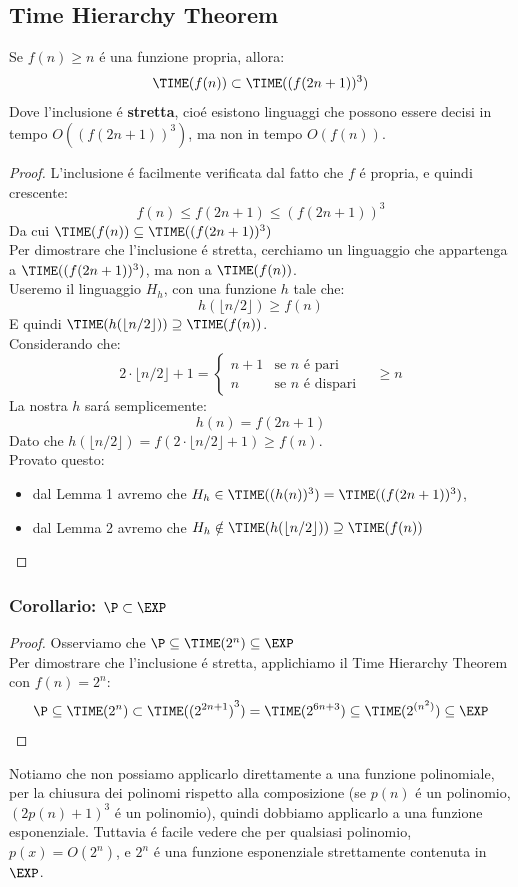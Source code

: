 \subsection{Time Hierarchy Theorem}
Se $f(n) \geq n$ é una funzione propria, allora:
\[\TIME(f(n)) \subset \TIME((f(2n + 1))^3)\]
Dove l'inclusione é \textbf{stretta}, cioé esistono linguaggi che possono essere decisi in tempo $O((f(2n+1))^3)$, ma non in tempo $O(f(n))$.
\begin{proof}
L'inclusione é facilmente verificata dal fatto che $f$ é propria, e quindi crescente: 
\[f(n) \leq f(2n + 1) \leq (f(2n + 1))^3\]
Da cui $\TIME(f(n)) \subseteq \TIME((f(2n+1))^3)$ \\

Per dimostrare che l'inclusione é stretta, cerchiamo un linguaggio che appartenga a $\TIME((f(2n + 1))^3)$, ma non a $\TIME(f(n))$. \\

Useremo il linguaggio $H_h$, con una funzione $h$ tale che:
\[
h(\lfloor n/2 \rfloor) \geq f(n)
\]
E quindi $\TIME(h(\lfloor n/2 \rfloor)) \supseteq \TIME(f(n))$. \\

Considerando che:
\[
2 \cdot \lfloor n/2 \rfloor + 1 =
\begin{cases}
    n + 1 & \text{se $n$ é pari} \\
    n     & \text{se $n$ é dispari}
\end{cases}
\quad \geq n
\]
La nostra $h$ sará semplicemente:
\[h(n) = f(2n + 1)\]
Dato che $h(\lfloor n/2 \rfloor) = f(2 \cdot \lfloor n/2 \rfloor + 1) \geq f(n)$. \\

Provato questo:
\begin{itemize}
    \item dal Lemma 1 avremo che $H_h \in \TIME((h(n))^3) = \TIME((f(2n + 1))^3)$, 
    \item dal Lemma 2 avremo che $H_h \notin \TIME(h(\lfloor n/2 \rfloor)) \supseteq \TIME(f(n))$
\end{itemize}    
\end{proof}

\subsubsection{Corollario: $\P \subset \EXP$}
\begin{proof}
    Osserviamo che $\P \subseteq \TIME(2^n) \subseteq \EXP$ \\
    Per dimostrare che l'inclusione é stretta, applichiamo il Time Hierarchy Theorem con $f(n) = 2^n$:
    \[\P \subseteq \TIME(2^n) \subset \TIME({(2^{2n+1})}^3) = \TIME(2^{6n+3}) \subseteq \TIME(2^{(n^2)}) \subseteq \EXP\]
\end{proof}
Notiamo che non possiamo applicarlo direttamente a una funzione polinomiale, per la chiusura dei polinomi rispetto alla composizione
(se $p(n)$ é un polinomio, $(2p(n) + 1)^3$ é un polinomio), 
quindi dobbiamo applicarlo a una funzione esponenziale.
Tuttavia é facile vedere che per qualsiasi polinomio, $p(x) = O(2^n)$, e $2^n$ é una funzione esponenziale strettamente contenuta in $\EXP$.

